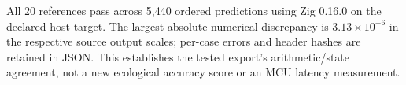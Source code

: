 All 20 references pass across 5,440 ordered predictions using Zig 0.16.0 on the declared host target. The largest absolute numerical discrepancy is $3.13\times10^{-6}$ in the respective source output scales; per-case errors and header hashes are retained in JSON. This establishes the tested export's arithmetic/state agreement, not a new ecological accuracy score or an MCU latency measurement.